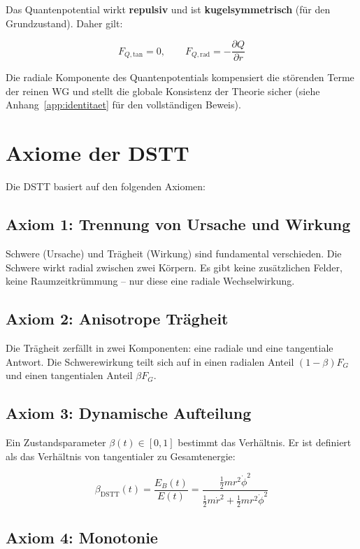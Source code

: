 Das Quantenpotential wirkt \textbf{repulsiv} und ist \textbf{kugelsymmetrisch} (für den Grundzustand). Daher gilt:

\[
F_{Q,\text{tan}} = 0, \qquad F_{Q,\text{rad}} = -\frac{\partial Q}{\partial r}
\]

Die radiale Komponente des Quantenpotentials kompensiert die störenden Terme der reinen WG und stellt die globale Konsistenz der Theorie sicher (siehe Anhang~\ref{app:identitaet} für den vollständigen Beweis).

\section{Axiome der DSTT}
\label{sec:dstt_axiome}

Die DSTT basiert auf den folgenden Axiomen:

\subsection{Axiom 1: Trennung von Ursache und Wirkung}
\label{sec:dstt_axiom1}

Schwere (Ursache) und Trägheit (Wirkung) sind fundamental verschieden. Die Schwere wirkt radial zwischen zwei Körpern. Es gibt keine zusätzlichen Felder, keine Raumzeitkrümmung – nur diese eine radiale Wechselwirkung.

\subsection{Axiom 2: Anisotrope Trägheit}
\label{sec:dstt_axiom2}

Die Trägheit zerfällt in zwei Komponenten: eine radiale und eine tangentiale Antwort. Die Schwerewirkung teilt sich auf in einen radialen Anteil \((1-\beta)F_G\) und einen tangentialen Anteil \(\beta F_G\).

\subsection{Axiom 3: Dynamische Aufteilung}
\label{sec:dstt_axiom3}

Ein Zustandsparameter \(\beta(t) \in [0,1]\) bestimmt das Verhältnis. Er ist definiert als das Verhältnis von tangentialer zu Gesamtenergie:

\[
\beta_{\text{DSTT}}(t) = \frac{E_B(t)}{E(t)} = \frac{\frac{1}{2}mr^2\dot{\phi}^2}{\frac{1}{2}m\dot{r}^2 + \frac{1}{2}mr^2\dot{\phi}^2}
\]

\subsection{Axiom 4: Monotonie}
\label{sec:dstt_axiom4}

